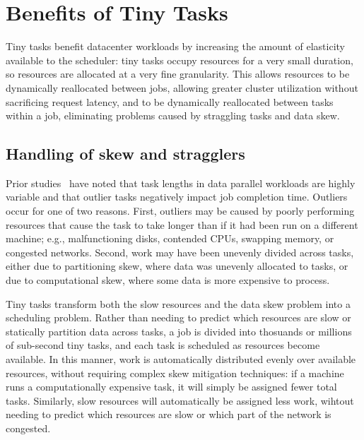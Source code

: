 \section{Benefits of Tiny Tasks}
\label{sec:benefits}

Tiny tasks benefit datacenter workloads by increasing the amount of elasticity
available to the scheduler: tiny tasks occupy resources for a very small
duration, so resources are allocated at a very fine granularity. This
allows resources to be dynamically reallocated between jobs, allowing greater
cluster utilization without sacrificing request latency, and to be dynamically
reallocated between tasks within a job, eliminating problems caused
by straggling tasks and data skew.

\subsection{Handling of skew and stragglers}
Prior studies~\cite{ananthanarayanan2010reining,zaharia2008improving} have noted that
task lengths in data parallel workloads are highly variable and that outlier
tasks negatively impact job completion time.
Outliers occur for one of two reasons.
First, outliers may be caused by poorly performing resources that cause the
task to take longer than if it had been run on a different machine; e.g.,
malfunctioning disks, contended CPUs, swapping memory, or congested networks.
Second, work may have been unevenly
divided across tasks, either due to
partitioning skew, where data was unevenly allocated to tasks, or due to
computational skew, where some data is more expensive to process.

Tiny tasks transform both the slow resources and the data skew problem
into a scheduling problem.  Rather than needing to predict which resources
are slow or statically partition data across tasks, a job is divided into
thosuands or millions of sub-second tiny tasks, and each task is scheduled
as resources become available.  In this manner, work is automatically
distributed evenly over available resources, without requiring complex skew
mitigation techniques: if a machine runs a computationally expensive task, it
will simply be assigned fewer total tasks.  Similarly, slow resources will
automatically be assigned less work, wihtout needing to predict which
resources are slow or which part of the network is congested.

